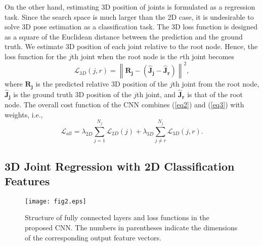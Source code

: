 \documentclass[runningheads]{llncs}
\begin{document}
On the other hand, estimating 3D position of joints is formulated as a regression task. Since the search space is much larger than the 2D case, it is undesirable to solve 3D pose estimation as a classification task. The 3D loss function is designed as a square of the Euclidean distance between the prediction and the ground truth. We estimate 3D position of each joint relative to the root node. Hence, the loss function for the $j$th joint when the root node is the $r$th joint becomes
\begin{equation}\label{eq3}
  \mathcal{L}_{3D}(j,r) = \left \lVert \mathbf{R_j} - (\mathbf{\hat{J}_j} - \mathbf{\hat{J}_{r}}) \right \rVert ^2,
\end{equation}
where $\mathbf{R_j}$ is the predicted relative 3D position of the $j$th joint from the root node, $\mathbf{\hat{J}_j}$ is the ground truth 3D position of the $j$th joint, and $\mathbf{\hat{J}_{r}}$ is that of the root node. The overall cost function of the CNN combines (\ref{eq2}) and (\ref{eq3}) with weights, i.e.,
\begin{equation}\label{eq4}
  \mathcal{L}_{all} = \lambda_{2D} \sum_{j=1}^{N_j}\mathcal{L}_{2D}(j) + \lambda_{3D} \sum_{j \neq r}^{N_j} \mathcal{L}_{3D} (j,r).
\end{equation}

\subsection{3D Joint Regression with 2D Classification Features}

\begin{figure}[t]
\centering
   \texttt{[image: fig2.eps]}
    \caption{Structure of fully connected layers and loss functions in the proposed CNN. The numbers in parentheses indicate the dimensions of the corresponding output feature vectors.}
    \label{fig2}
\end{figure}
\end{document}
